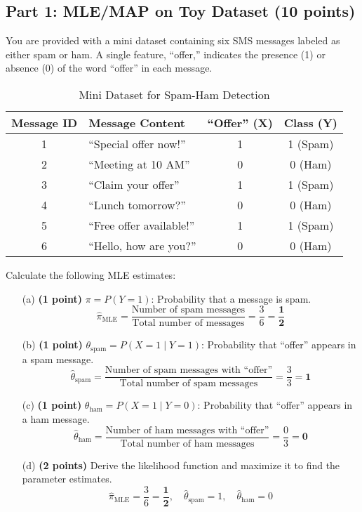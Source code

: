 \documentclass{article}
\begin{document}
\subsection*{Part 1: MLE/MAP on Toy Dataset (10 points)}
You are provided with a mini dataset containing six SMS messages labeled as either spam or ham. A single feature, ``offer,'' indicates the presence (1) or absence (0) of the word ``offer'' in each message.

\begin{table}[h!]
    \centering
    \begin{tabular}{|c|l|c|c|}
        \hline
        \textbf{Message ID} & \textbf{Message Content} & \textbf{``Offer'' (X)} & \textbf{Class (Y)} \\
        \hline
        1 & ``Special offer now!'' & 1 & 1 (Spam) \\
        2 & ``Meeting at 10 AM'' & 0 & 0 (Ham) \\
        3 & ``Claim your offer'' & 1 & 1 (Spam) \\
        4 & ``Lunch tomorrow?'' & 0 & 0 (Ham) \\
        5 & ``Free offer available!'' & 1 & 1 (Spam) \\
        6 & ``Hello, how are you?'' & 0 & 0 (Ham) \\
        \hline
    \end{tabular}
    \caption{Mini Dataset for Spam-Ham Detection}
\end{table}

\noindent Calculate the following MLE estimates:
\begin{itemize}
    \item[(a)] \textbf{(1 point)} $\pi = P(Y = 1)$: Probability that a message is spam.
    \[
    \hat{\pi}_{\text{MLE}} = \frac{\text{Number of spam messages}}{\text{Total number of messages}} = \frac{3}{6} = \mathbf{\frac{1}{2}}
    \]
    \item[(b)] \textbf{(1 point)} $\theta_{\text{spam}} = P(X = 1 \mid Y = 1)$: Probability that ``offer'' appears in a spam message.
    \[
    \hat{\theta}_{\text{spam}} = \frac{\text{Number of spam messages with ``offer''}}{\text{Total number of spam messages}} = \frac{3}{3} = \mathbf{1}
    \]
    \item[(c)] \textbf{(1 point)} $\theta_{\text{ham}} = P(X = 1 \mid Y = 0)$: Probability that ``offer'' appears in a ham message.
    \[
    \hat{\theta}_{\text{ham}} = \frac{\text{Number of ham messages with ``offer''}}{\text{Total number of ham messages}} = \frac{0}{3} = \mathbf{0}
    \]
    \item[(d)] \textbf{(2 points)} Derive the likelihood function and maximize it to find the parameter estimates. 
    \[
    \hat{\pi}_{\text{MLE}} = \frac{3}{6} = \mathbf{\frac{1}{2}}, \quad \hat{\theta}_{\text{spam}} = 1, \quad \hat{\theta}_{\text{ham}} = 0
    \]
\end{itemize}
\end{document}
